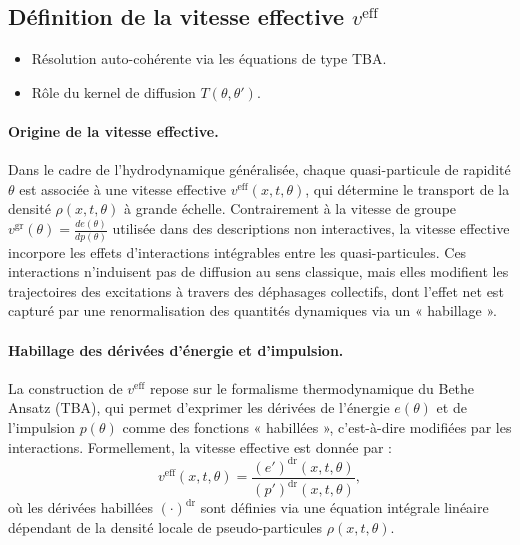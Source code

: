 \subsection{Définition de la vitesse effective $v^{\mathrm{eff}}$}
{\color{blue}
\begin{itemize}
    \item Résolution auto-cohérente via les équations de type TBA.
    \item Rôle du kernel de diffusion $T(\theta,\theta')$.
\end{itemize}
}

\paragraph{Origine de la vitesse effective.}
Dans le cadre de l’hydrodynamique généralisée, chaque quasi-particule de rapidité $\theta$ est associée à une vitesse effective $v^{\mathrm{eff}}(x,t,\theta)$, qui détermine le transport de la densité $\rho(x,t,\theta)$ à grande échelle. Contrairement à la vitesse de groupe $v^{\mathrm{gr}}(\theta) = \frac{d e(\theta)}{d p(\theta)}$ utilisée dans des descriptions non interactives, la vitesse effective incorpore les effets d’interactions intégrables entre les quasi-particules. Ces interactions n’induisent pas de diffusion au sens classique, mais elles modifient les trajectoires des excitations à travers des déphasages collectifs, dont l'effet net est capturé par une renormalisation des quantités dynamiques via un « habillage ».

\paragraph{Habillage des dérivées d’énergie et d’impulsion.}
La construction de $v^{\mathrm{eff}}$ repose sur le formalisme thermodynamique du Bethe Ansatz (TBA), qui permet d’exprimer les dérivées de l’énergie $e(\theta)$ et de l’impulsion $p(\theta)$ comme des fonctions « habillées », c’est-à-dire modifiées par les interactions. Formellement, la vitesse effective est donnée par :
\[
v^{\mathrm{eff}}(x,t,\theta) = \frac{(e')^{\mathrm{dr}}(x,t,\theta)}{(p')^{\mathrm{dr}}(x,t,\theta)},
\]
où les dérivées habillées $(\cdot)^{\mathrm{dr}}$ sont définies via une équation intégrale linéaire dépendant de la densité locale de pseudo-particules $\rho(x,t,\theta)$.


